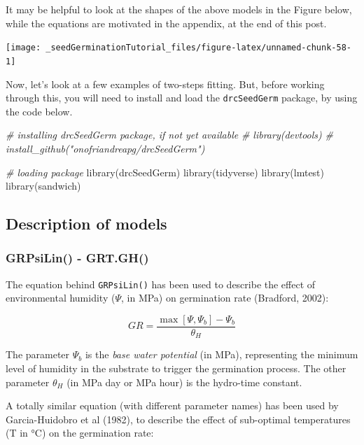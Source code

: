 \documentclass[
]{book}
\newenvironment{Shaded}{\begin{snugshade}}{\end{snugshade}}
\newcommand{\CommentTok}[1]{\textcolor[rgb]{0.56,0.35,0.01}{\textit{#1}}}
\newcommand{\FunctionTok}[1]{\textcolor[rgb]{0.00,0.00,0.00}{#1}}
\newcommand{\NormalTok}[1]{#1}
\begin{document}
It may be helpful to look at the shapes of the above models in the Figure below, while the equations are motivated in the appendix, at the end of this post.

\texttt{[image: \_seedGerminationTutorial\_files/figure-latex/unnamed-chunk-58-1]}

Now, let's look at a few examples of two-steps fitting. But, before working through this, you will need to install and load the \texttt{drcSeedGerm} package, by using the code below.

\begin{Shaded}
\begin{Highlighting}[]
\CommentTok{\# installing drcSeedGerm package, if not yet available}
\CommentTok{\# library(devtools)}
\CommentTok{\# install\_github("onofriandreapg/drcSeedGerm")}

\CommentTok{\# loading package}
\FunctionTok{library}\NormalTok{(drcSeedGerm)}
\FunctionTok{library}\NormalTok{(tidyverse)}
\FunctionTok{library}\NormalTok{(lmtest)}
\FunctionTok{library}\NormalTok{(sandwich)}
\end{Highlighting}
\end{Shaded}

\hypertarget{description-of-models}{%
\subsection{Description of models}\label{description-of-models}}

\hypertarget{grpsilin---grt.gh}{%
\subsubsection{GRPsiLin() - GRT.GH()}\label{grpsilin---grt.gh}}

The equation behind \texttt{GRPsiLin()} has been used to describe the effect of environmental humidity (\(\Psi\), in MPa) on germination rate (Bradford, 2002):

\[GR = \frac{\max\left[\Psi, \Psi_b\right] - \Psi_b}{\theta_H}\]

The parameter \(\Psi_b\) is the \emph{base water potential} (in MPa), representing the minimum level of humidity in the substrate to trigger the germination process. The other parameter \(\theta_H\) (in MPa day or MPa hour) is the hydro-time constant.

A totally similar equation (with different parameter names) has been used by Garcia-Huidobro et al (1982), to describe the effect of sub-optimal temperatures (T in °C) on the germination rate:
\end{document}
